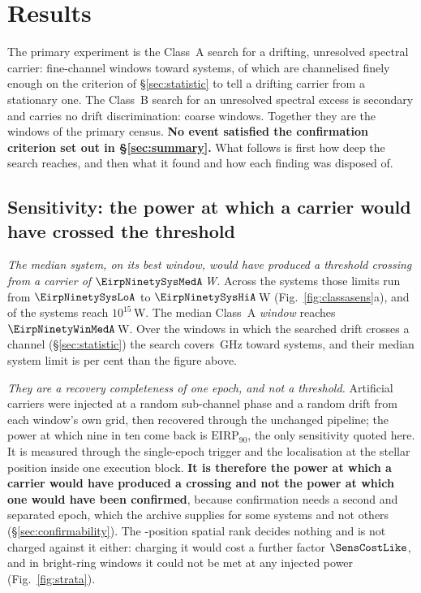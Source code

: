 \section{Results}
\label{sec:results}

The primary experiment is the Class~A search for a drifting, unresolved
spectral carrier: \NWinA{} fine-channel windows toward \NSysClassA{}
systems, \EdrNWinA{} of which are channelised finely enough on the criterion
of \S\ref{sec:statistic} to tell a drifting carrier from a stationary one.
The Class~B search for an unresolved spectral excess is secondary
and carries no drift discrimination: \NWinB{} coarse windows. Together they
are the \NWindows{} windows of the primary census. \textbf{No event
satisfied the confirmation criterion set out in \S\ref{sec:summary}.} What
follows is first how deep the search reaches, and then what it found and how
each finding was disposed of.

\subsection{Sensitivity: the power at which a carrier would have crossed
the threshold} \label{sec:pninetysel}

\emph{The median system, on its best window, would have produced a threshold
crossing from a carrier of $\EirpNinetySysMedA$\,W.} Across the \NSysClassA{} systems those limits
run from $\EirpNinetySysLoA$ to $\EirpNinetySysHiA$\,W
(Fig.~\ref{fig:classasens}a), and \NSysEfifteen{} of the systems reach
$10^{15}$\,W. The median Class~A \emph{window} reaches
$\EirpNinetyWinMedA$\,W.
Over the \EdrNWinA{} windows in which the searched drift crosses a channel
(\S\ref{sec:statistic}) the search covers \EdrUnionGHz\,GHz toward
\EdrNSys{} systems, and their median system limit is \ScEdrMedPct{} per cent
\ScEdrMedSense{} than the figure above.

\emph{They are a recovery completeness of one epoch, and not a threshold.}
Artificial carriers were injected at a random sub-channel phase and a random
drift from each window's own grid, then recovered through the unchanged
pipeline; the power at which nine in ten come back is
$\mathrm{EIRP}_{90}$, the only sensitivity quoted here. It is measured
through the single-epoch trigger and the localisation at the stellar position
inside one execution block. \textbf{It is therefore the power at which a
carrier would have produced a crossing and not the power at which one would
have been confirmed}, because confirmation needs a second and separated epoch, which the archive
supplies for some systems and not others (\S\ref{sec:confirmability}). The \NCtrl-position spatial rank
decides nothing and is not charged against it either: charging it would cost
a further factor $\SensCostLike$, and in \SensNRingHiUnres{} bright-ring
windows it could not be met at any injected power (Fig.~\ref{fig:strata}).

